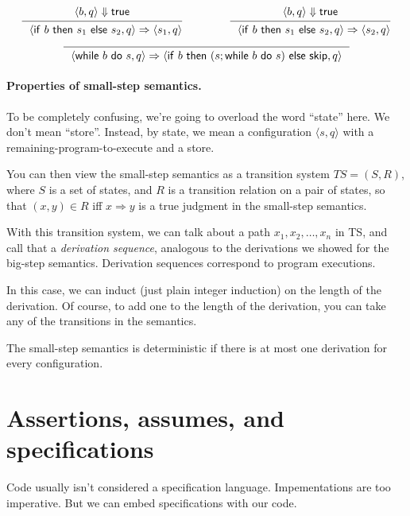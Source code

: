 \documentclass[11pt]{article}
\begin{document}
  \[
  \begin{prooftree}
    \hypo{\langle b, q \rangle \Downarrow \mathsf{true}}
  \infer1{~~\langle \mathsf{if} ~b~ \mathsf{then} ~s_1~ \mathsf{else} ~s_2, q \rangle \Rightarrow \langle s_1, q\rangle }
  \end{prooftree}  \hspace*{4em} \
  \begin{prooftree}
    \hypo{\langle b, q \rangle \Downarrow \mathsf{true}}
  \infer1{~~\langle \mathsf{if} ~b~ \mathsf{then} ~s_1~ \mathsf{else} ~s_2, q \rangle \Rightarrow \langle s_2, q\rangle }
  \end{prooftree}
  \]
\[
\begin{prooftree}
  \infer0{~~\langle \mathsf{while} ~b~ \mathsf{do} ~s,q\rangle \Rightarrow \langle \mathsf{if } ~b~ \mathsf{then~} (s; \mathsf{while} ~b~ \mathsf{do} ~s)~ \mathsf{else~skip}, q \rangle~~}
\end{prooftree}
\]

\paragraph{Properties of small-step semantics.} To be completely confusing,
we're going to overload the word ``state'' here. We don't mean ``store''.
Instead, by state, we mean a configuration $\langle s, q \rangle$
with a remaining-program-to-execute and a store.

You can then view the small-step semantics as a transition system
$\mathit{TS} = (S, R)$, where $S$ is a set of states, and $R$ is
a transition relation on a pair of states, so that $(x, y) \in R$ iff
$x \Rightarrow y$ is a true judgment in the small-step semantics.

With this transition system, we can talk about a path $x_1, x_2,
\ldots, x_n$ in TS, and call that a \emph{derivation sequence},
analogous to the derivations we showed for the big-step semantics.
Derivation sequences correspond to program executions.

In this case, we can induct (just plain integer induction) on the
length of the derivation. Of course, to add one to the length
of the derivation, you can take any of the transitions in the semantics.

The small-step semantics is deterministic if there is at most one
derivation for every configuration.

\section*{Assertions, assumes, and specifications}
Code usually isn't considered a specification language. Impementations are
too imperative. But we can embed specifications with our code.
\end{document}
